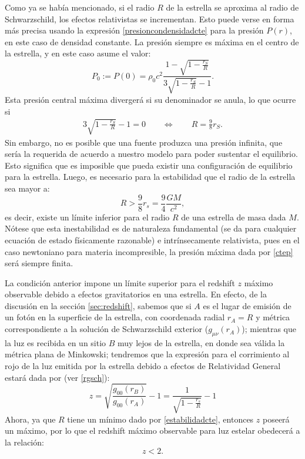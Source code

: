 Como ya se había mencionado, si el radio $R$ de la estrella se aproxima al radio de Schwarzschild, los efectos relativistas se incrementan. Esto puede verse en forma más precisa usando la expresión \eqref{presioncondensidadcte} para la presión $P(r)$, en este caso de densidad constante. La presión siempre es máxima en el centro de la estrella, y en este caso asume el valor:
\begin{equation}
 P_0:=P(0)=\rho_{0}c^2\frac{1-\sqrt{1-\frac{r_S}{R}}}{3 \sqrt{1-\frac{r_S}{R}}-1}.
\end{equation}
Esta presión central máxima divergerá si su denominador se anula, lo que ocurre si
\begin{align}
3 \sqrt{1-\frac{r_S}{R}}-1=0 \qquad 
\Leftrightarrow\qquad R=\frac{9}{8}r_S .
\end{align}
Sin embargo, no es posible que una fuente produzca una presión infinita, que sería la requerida de acuerdo a nuestro modelo para poder sustentar el equilibrio. Esto significa que es imposible que pueda existir una configuración de equilibrio para la estrella. Luego, es necesario para la estabilidad que el radio de la estrella sea mayor a:
\begin{equation}\label{estabilidadcte}
 \boxed{R>\frac{9}{8}r_s=\frac{9}{4}\frac{GM}{c^2}},
\end{equation}
es decir, existe un límite inferior para el radio $R$ de una estrella de masa dada $M$. Nótese que esta inestabilidad es de naturaleza fundamental (se da para cualquier ecuación de estado físicamente razonable) e intrínsecamente relativista, pues en el caso newtoniano para materia incompresible, la presión máxima dada por \eqref{ctep} será siempre finita.

La condición anterior impone un límite superior para el redshift $z$ máximo observable debido a efectos gravitatorios en una estrella. En efecto, de la discusión en la sección \ref{sec:redshift}, sabemos que si $A$ es el lugar de emisión de un fotón en la superficie de la estrella, con coordenada radial $r_A=R$ y métrica correspondiente a la solución de Schwarzschild exterior ($g_{\mu\nu}(r_A)$); mientras que la luz es recibida en un sitio $B$ muy lejos de la estrella, en donde sea válida la métrica plana de Minkowski; tendremos que la expresión para el corrimiento al rojo de la luz emitida por la estrella debido a efectos de Relatividad General estará dada por  (ver \eqref{rgsch}):
\begin{equation}
 z=\sqrt{\frac{g_{00}(r_B)}{g_{00}(r_A)}}-1=\frac{1}{\sqrt{1-\frac{r_s}{R}}}-1
\end{equation}
Ahora, ya que $R$ tiene un mínimo dado por \eqref{estabilidadcte}, entonces $z$ poseerá un máximo, por lo que el redshift máximo observable para luz estelar obedecerá a la relación:
\begin{equation}
 z<2.
\end{equation}


